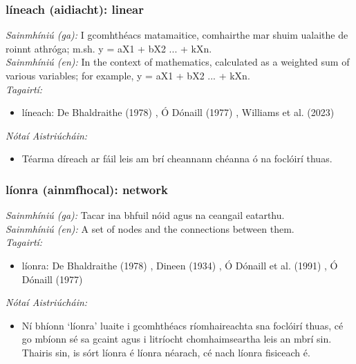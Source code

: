 \subsubsection*{líneach (aidiacht): linear}
 \noindent \textit{Sainmhíniú (ga):} I gcomhthéacs matamaitice, comhairthe mar shuim ualaithe de roinnt athróga; m.sh. y = aX1 + bX2 ... + kXn.
\\
 \noindent \textit{Sainmhíniú (en):} In the context of mathematics, calculated as a weighted sum of various variables; for example, y = aX1 + bX2 ... + kXn.
\\
 \noindent \textit{Tagairtí:}
\begin{itemize}
	\item líneach: De Bhaldraithe (1978) \cite{de-bhaldraithe}, Ó Dónaill (1977) \cite{odonaill}, Williams et al. (2023) \cite{storchiste}
\end{itemize}

 \noindent \textit{Nótaí Aistriúcháin:}
\begin{itemize}
	\item Téarma díreach ar fáil leis am brí cheannann chéanna ó na foclóirí thuas.
\end{itemize}


\subsubsection*{líonra (ainmfhocal): network}
 \noindent \textit{Sainmhíniú (ga):} Tacar ina bhfuil nóid agus na ceangail eatarthu.
\\
 \noindent \textit{Sainmhíniú (en):} A set of nodes and the connections between them.
\\
 \noindent \textit{Tagairtí:}
\begin{itemize}
	\item líonra: De Bhaldraithe (1978) \cite{de-bhaldraithe}, Dineen (1934) \cite{dineen}, Ó Dónaill et al. (1991) \cite{focloir-beag}, Ó Dónaill (1977) \cite{odonaill}
\end{itemize}

 \noindent \textit{Nótaí Aistriúcháin:}
\begin{itemize}
	\item Ní bhíonn `líonra' luaite i gcomhthéacs ríomhaireachta sna foclóirí thuas, cé go mbíonn sé sa gcaint agus i litríocht chomhaimseartha leis an mbrí sin. Thairis sin, is sórt líonra é líonra néarach, cé nach líonra fisiceach é.
\end{itemize}


